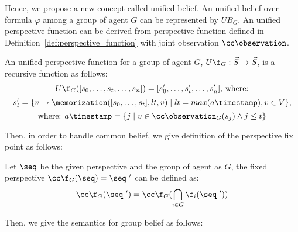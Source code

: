 Hence, we propose a new concept called unified belief.
An unified belief over formula $\varphi$ among a group of agent $G$ can be represented by $UB_G$.
An unified perspective function can be derived from perspective function defined in Definition~\ref{def:perspective_function} with joint observation $\cc\observation$.

\begin{definition}
    
    \label{def:unified_perspective_function}
    An unified perspective function for a group of agent $G$, $U\f_G: \vec{S} \rightarrow \vec{S}$, is a recursive function as follows:
    \[
    U\f_G([s_0,\dots,s_t,\dots,s_n])=[s'_0,\dots,s'_t,\dots,s'_n] \text{, where:}
    \]
    \[    
    s'_t = \{v \mapsto \memorization([s_0,\dots,s_t],lt,v) \mid lt = max(a\timestamp), v\in V\} \text{,} 
    \]
    \[    
    \text{where: }a\timestamp = \{j \mid v \in \cc\observation_G(s_j) \land j \leq t \}
    \]




\end{definition}
\vspace{2mm}

Then, in order to handle common belief, we give definition of the perspective fix point as follows:

\begin{definition}
\label{def:fix_perspective}
    Let $\seq$ be the given perspective and the group of agent as $G$, the fixed perspective $\cc\f_G(\seq) = \seq~'$ can be defined as:
    \[
        \cc\f_G(\seq~') = \cc\f_G(\bigcap_{i \in G} \f_i(\seq~'))
    \]
    
\end{definition}


Then, we give the semantics for group belief as follows:
\vspace{2mm}

